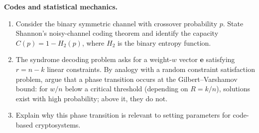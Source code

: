 \begin{prob}
\label{prob:ch09-physics}
\textbf{Codes and statistical mechanics.}
\begin{enumerate}
\item[(a)] Consider the binary symmetric channel with crossover probability $p$.  State Shannon's noisy-channel coding theorem and identify the capacity $C(p) = 1 - H_2(p)$, where $H_2$ is the binary entropy function.
\item[(b)] The syndrome decoding problem asks for a weight-$w$ vector $\mathbf{e}$ satisfying $r = n - k$ linear constraints.  By analogy with a random constraint satisfaction problem, argue that a phase transition occurs at the Gilbert--Varshamov bound: for $w/n$ below a critical threshold (depending on $R = k/n$), solutions exist with high probability; above it, they do not.
\item[(c)] Explain why this phase transition is relevant to setting parameters for code-based cryptosystems.
\end{enumerate}
\end{prob}
